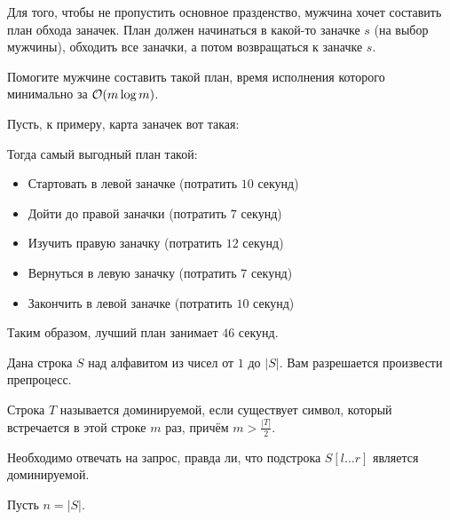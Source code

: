 \documentclass[addpoints]{exam}
\begin{document}
\begin{questions}
Для того, чтобы не пропустить основное празденство, мужчина хочет составить план обхода заначек. План должен начинаться в какой-то заначке $s$ (на выбор мужчины), обходить все заначки, а потом возвращаться к заначке $s$.

Помогите мужчине составить такой план, время исполнения которого минимально за $\mathcal{O}(m \log{m})$.

Пусть, к примеру, карта заначек вот такая:

\begin{center}
\end{center}

Тогда самый выгодный план такой:

\begin{itemize}
\item Стартовать в левой заначке (потратить $10$ секунд)
\item Дойти до правой заначки (потратить $7$ секунд)
\item Изучить правую заначку (потратить $12$ секунд)
\item Вернуться в левую заначку (потратить $7$ секунд)
\item Закончить в левой заначке (потратить $10$ секунд)
\end{itemize}

Таким образом, лучший план занимает $46$ секунд.

\question Дана строка $S$ над алфавитом из чисел от $1$ до $|S|$. Вам разрешается произвести препроцесс. 

Строка $T$ называется доминируемой, если существует символ, который встречается в этой строке $m$ раз, причём $m > \frac{|T|}{2}$.

Необходимо отвечать на запрос, правда ли, что подстрока $S[l\ldots r]$ является доминируемой.

Пусть $n = |S|$.


\end{questions}

\begin{center}
\pointtable[h][questions]
\end{center}
\end{document}
